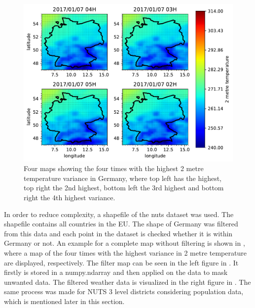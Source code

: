 

\begin{figure}[h!]%
\centering
\includegraphics[width=\textwidth]{plots/t2m/bundles/maxvar4_maps}%
\caption{Four maps showing the four times with the highest 2 metre temperature variance in Germany, where top left has the highest, top right the 2nd highest, bottom left the 3rd highest and bottom right the 4th highest variance.}%
\label{fig:maxvar4_maps}%
\end{figure}

In order to reduce complexity, a shapefile of the \acrshort{nuts} dataset was used. The shapefile contains all countries in the EU. The shape of Germany was filtered from this data and each point in the dataset is checked whether it is within Germany or not. An example for a complete map without filtering is shown in , where a map of the four times with the highest variance in 2 metre temperature are displayed, respectively. The filter map can be seen in the left figure in . It firstly is stored in a numpy.ndarray and then applied on the data to mask unwanted data. The filtered weather data is visualized in the right figure in . The same process was made for NUTS 3 level districts considering population data, which is mentioned later in this section.\\

